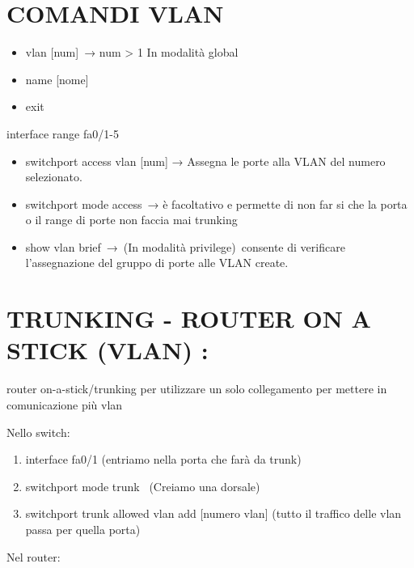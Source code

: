 \documentclass[
]{article}
\providecommand{\tightlist}{%
  \setlength{\itemsep}{0pt}\setlength{\parskip}{0pt}}
\begin{document}
\section{\texorpdfstring{{COMANDI
VLAN}}{COMANDI VLAN}}\label{h.ljszie3jtgtn}

\begin{itemize}
\tightlist
\item
  {vlan {[}num{]}}{~→ }{num \textgreater{} 1 In modalità global }
\item
  {name {[}nome{]}}
\item
  {exit}
\end{itemize}

{interface range fa0/1-5 ~ }

\begin{itemize}
\tightlist
\item
  {switchport access vlan {[}num{]} }{→ }{Assegna le porte alla VLAN del
  numero selezionato.}
\item
  {switchport mode access}{~}{→ }{è facoltativo e permette di non far si
  che la porta o il range di porte non faccia mai trunking}
\item
  {show vlan brief}{~→}{~(In modalità privilege)}{~}{consente di
  verificare l'assegnazione del gruppo di porte alle VLAN create.}
\end{itemize}

{}

\section{\texorpdfstring{{TRUNKING - }{ROUTER ON A STICK (VLAN)
:}}{TRUNKING - ROUTER ON A STICK (VLAN) :}}\label{h.osf1xjmnsjz3}

{router on-a-stick/trunking per utilizzare un solo collegamento per
mettere in comunicazione più vlan}

{Nello switch:}

\begin{enumerate}
\tightlist
\item
  {interface fa0/1 (entriamo nella porta che farà da trunk)}
\item
  {switchport mode trunk ~(Creiamo una dorsale)}
\item
  {switchport trunk allowed vlan add {[}numero vlan{]} (tutto il
  traffico delle vlan passa per quella porta)}
\end{enumerate}

{}

{Nel router:}
\end{document}
